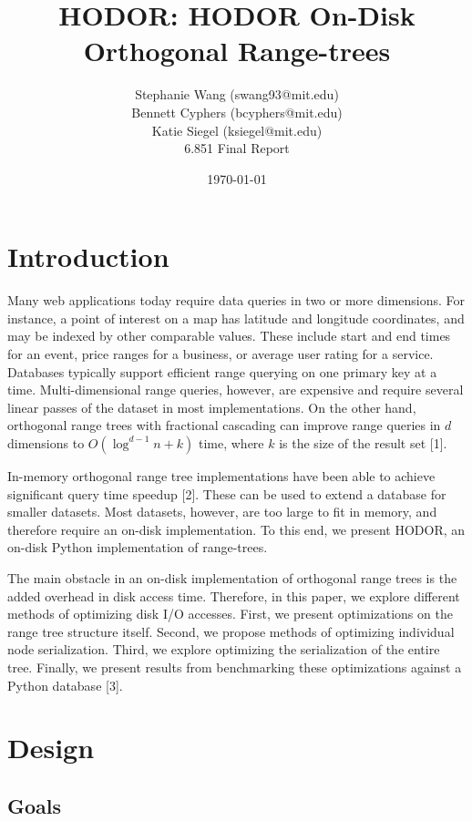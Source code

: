 \documentclass[11pt, oneside]{article}
\title{HODOR: HODOR On-Disk Orthogonal Range-trees}
\author{Stephanie Wang (swang93@mit.edu)\\
Bennett Cyphers (bcyphers@mit.edu)\\
Katie Siegel (ksiegel@mit.edu)\\[2ex]
6.851 Final Report}
\date{\today}
\begin{document}
\maketitle
\clearpage

\section{Introduction}

Many web applications today require data queries in two or more dimensions. For
instance, a point of interest on a map has latitude and longitude coordinates,
and may be indexed by other comparable values. These include start and end
times for an event, price ranges for a business, or average user rating for a
service. Databases typically support efficient range querying on one primary
key at a time. Multi-dimensional range queries, however, are expensive and
require several linear passes of the dataset in most implementations. On the
other hand, orthogonal range trees with fractional cascading can improve range
queries in $d$ dimensions to $O(\log^{d-1} n + k)$ time, where $k$ is the size
of the result set [1]. 

In-memory orthogonal range tree implementations have been able to achieve
significant query time speedup [2]. These can be used to
extend a database for smaller datasets. Most datasets, however, are too large
to fit in memory, and therefore require an on-disk implementation. To this end,
we present HODOR, an on-disk Python implementation of range-trees. 

The main obstacle in an on-disk implementation of orthogonal range trees is the
added overhead in disk access time. Therefore, in this paper, we explore
different methods of optimizing disk I/O accesses. First, we present
optimizations on the range tree structure itself. Second, we propose methods of
optimizing individual node serialization. Third, we explore optimizing the
serialization of the entire tree. Finally, we present results from benchmarking
these optimizations against a Python database [3]. 


\section{Design}

\subsection{Goals}
\end{document}
